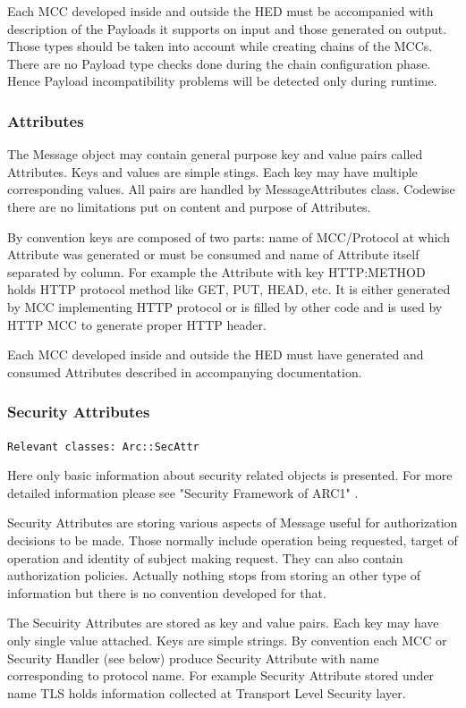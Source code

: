 \documentclass{book}
\begin{document}
Each MCC developed inside and outside the HED must be accompanied with description of the Payloads it supports on input and those generated on output. Those types should be taken into account while creating chains of the MCCs. There are no Payload type checks done during the chain configuration phase. Hence Payload incompatibility problems will be detected only during runtime.

\subsubsection{Attributes}

The Message object may contain general purpose key and value pairs called Attributes. Keys and values are simple stings. Each key may have multiple corresponding values. All pairs are handled by MessageAttributes class. Codewise there are no limitations put on content and purpose of Attributes.

By convention keys are composed of two parts: name of MCC/Protocol at which Attribute was generated or must be consumed and name of Attribute itself separated by column. For example the Attribute with key HTTP:METHOD holds HTTP protocol method like GET, PUT, HEAD, etc. It is either generated by MCC implementing HTTP protocol or is filled by other code and is used by HTTP MCC to generate proper HTTP header.

Each MCC developed inside and outside the HED must have generated and consumed Attributes described in accompanying documentation.


\subsubsection{Security Attributes}

\texttt{Relevant classes: Arc::SecAttr}

Here only basic information about security related objects is presented. For more detailed information please see "Security Framework of ARC1" \cite{sec-arc1}.

Security Attributes are storing various aspects of Message useful for authorization decisions to be made. Those normally include operation being requested, target of operation and identity of subject making request. They can also contain authorization policies. Actually nothing stops from storing an other type of information but there is no convention developed for that.

The Secuirity Attributes are stored as key and value pairs. Each key may have only single value attached. Keys are simple strings. By convention each MCC or Security Handler (see below) produce Security Attribute with name corresponding to protocol name. For example Security Attribute stored under name TLS holds information collected at Transport Level Security layer.
\end{document}

